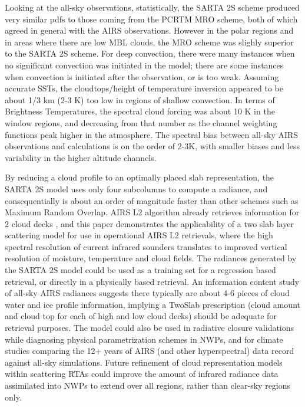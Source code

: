 \documentclass[agupp]{aguplus}              %
\begin{document}
\begin{article}
Looking at the all-sky observations, statistically, the SARTA 2S
scheme produced very similar pdfs to those coming from the PCRTM MRO
scheme, both of which agreed in general with the AIRS
observations. However in the polar regions and in areas where there
are low MBL clouds, the MRO scheme was slighly superior to the SARTA
2S scheme. For deep convection, there were many instances when no
significant convection was initiated in the model; there are some
instances when convection is initiated after the observation, or is
too weak. Assuming accurate SSTs, the cloudtops/height of temperature
inversion appeared to be about 1/3 km (2-3 K) too low in regions of
shallow convection. In terms of Brightness Temperatures, the spectral
cloud forcing was about 10 K in the window regions, and decreasing from
that number as the channel weighting functions peak higher in the
atmosphere. The spectral bias between all-sky AIRS observations and
calculations is on the order of 2-3K, with smaller biases and 
less variability in the higher altitude channels. 
 
By reducing a cloud profile
to an optimally placed slab representation, the SARTA 2S model uses
only four subcolumns to compute a radiance, and consequentially is
about an order of magnitude faster than other schemes such as Maximum
Random Overlap. 
AIRS L2 algorithm already retrieves information for 2 cloud decks
\citep{kah:08}, and this paper demonstrates the applicability of a two
slab layer scattering model for use in operational AIRS L2 retrievals,
where the high spectral resolution of current infrared sounders
translates to improved vertical resolution of moisture, temperature
and cloud fields.  The radiances generated by the SARTA 2S model could
be used as a training set for a regression based retrieval, or
directly in a physically based retrieval.  An information content
study of all-sky AIRS radiances suggests there typically are about 4-6
pieces of cloud water and ice profile information, implying a TwoSlab
prescription (cloud amount and cloud top for each of high and low
cloud decks) should be adequate for retrieval purposes. The model
could also be used in radiative closure validations while diagnosing
physical parametrization schemes in NWPs, and for climate studies
comparing the 12+ years of AIRS (and other hyperspectral) data record
against all-sky simulations.  Future refinement of cloud
representation models within scattering RTAs could improve the amount
of infrared radiance data assimilated into NWPs to extend over all
regions, rather than clear-sky regions only.


\end{article}
\end{document}
